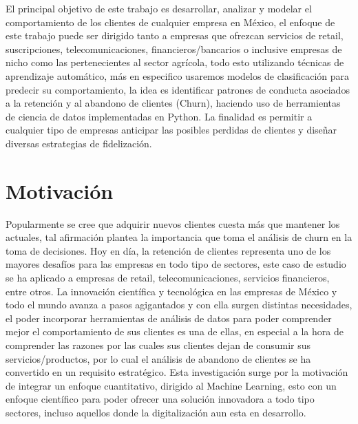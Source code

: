 El principal objetivo de este trabajo es desarrollar, analizar y modelar el comportamiento de los clientes de cualquier empresa en México, el enfoque de este trabajo puede ser dirigido tanto a empresas que ofrezcan servicios de retail, suscripciones, telecomunicaciones, financieros/bancarios o inclusive empresas de nicho como las pertenecientes al sector agrícola, todo esto utilizando técnicas de aprendizaje automático, más en especifico usaremos modelos de clasificación para predecir su comportamiento, la idea es identificar patrones de conducta asociados a la retención y al abandono de clientes (Churn), haciendo uso de herramientas de ciencia de datos implementadas en Python. La finalidad es permitir a cualquier tipo de empresas anticipar las posibles perdidas de clientes y diseñar diversas estrategias de fidelización.
\section{Motivación}

Popularmente se cree que adquirir nuevos clientes cuesta más que mantener los actuales, tal afirmación plantea la importancia que toma el análisis de churn en la toma de decisiones. Hoy en día, la retención de clientes representa uno de los mayores desafíos para las empresas en todo tipo de sectores, este caso de estudio se ha aplicado a empresas de retail, telecomunicaciones, servicios financieros, entre otros. La innovación científica y tecnológica en las empresas de México y todo el mundo avanza a pasos agigantados y con ella surgen distintas necesidades, el poder incorporar herramientas de análisis de datos para poder comprender mejor el comportamiento de sus clientes es una de ellas, en especial a la hora de comprender las razones por las cuales sus clientes dejan de consumir sus servicios/productos, por lo cual el análisis de abandono de clientes se ha convertido en un requisito  estratégico. Esta investigación surge por la motivación de integrar un enfoque cuantitativo, dirigido al Machine Learning, esto con un enfoque científico para poder ofrecer una solución innovadora a todo tipo sectores, incluso aquellos donde la digitalización aun esta en desarrollo.


